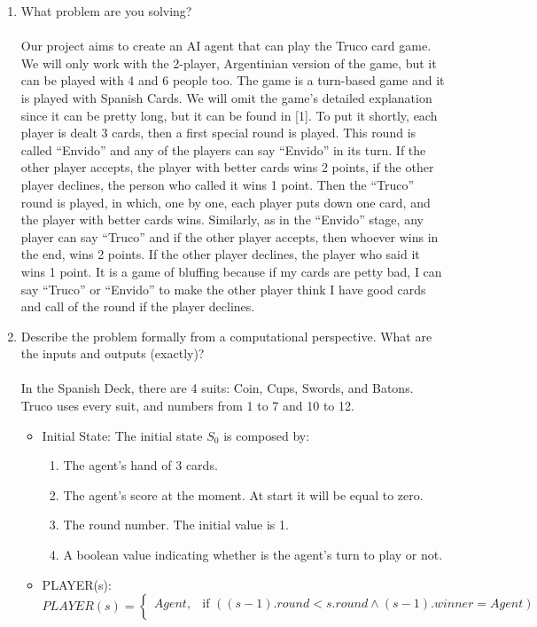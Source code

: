 \documentclass{article}
\begin{document}
\begin{enumerate}
\item What problem are you solving?
\\\\
Our project aims to create an AI agent that can play the Truco card game. We will only work with the 2-player, Argentinian version of the game, but it can be played with 4 and 6 people too. The game is a turn-based game and it is played with Spanish Cards. We will omit the game’s detailed explanation since it can be pretty long, but it can be found in [1]. To put it shortly, each player is dealt 3 cards, then a first special round is played. This round is called “Envido” and any of the players can say “Envido” in its turn. If the other player accepts, the player with better cards wins 2 points, if the other player declines, the person who called it wins 1 point. Then the “Truco” round is played, in which, one by one, each player puts down one card, and the player with better cards wins. Similarly, as in the “Envido” stage, any player can say “Truco” and if the other player accepts, then whoever wins in the end, wins 2 points. If the other player declines, the player who said it wins 1 point. It is a game of bluffing because if my cards are petty bad, I can say “Truco” or “Envido” to make the other player think I have good cards and call of the round if the player declines.
\\
\item Describe the problem formally from a computational perspective. What are the inputs and outputs (exactly)?
\\\\
In the Spanish Deck, there are 4 suits: Coin, Cups, Swords, and Batons. Truco uses every suit, and numbers from 1 to 7 and 10 to 12.
\begin{itemize}
	\item Initial State: The initial state $S_0$ is composed by:
	\begin{enumerate}
		\item The agent's hand of 3 cards.
		\item The agent's score at the moment. At start it will be equal to zero.      
		\item The round number. The initial value is 1.
		\item A boolean value indicating whether is the agent's turn to play or not.
	\end{enumerate}
	\item PLAYER(s):
	\[
	PLAYER(s) = 
	\begin{cases}
	Agent,& \text{if } ((s-1).round < s.round \land (s-1).winner = Agent) \\ 

\end{cases}\]
\end{itemize}
\end{enumerate}
\end{document}
